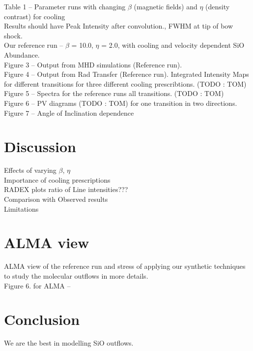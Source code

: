 \documentclass[useAMS,usenatbib,letters]{mn2e}
\begin{document}
Table 1 -- Parameter runs with changing $\beta$ (magnetic fields) and
$\eta$ (density contrast) for cooling \\
Results should have Peak Intensity after convolution., FWHM at tip of
bow shock.\\
Our reference run -- $\beta$ = 10.0, $\eta$ = 2.0, with cooling and
velocity dependent SiO Abundance. \\
Figure 3 -- Output from MHD simulations (Reference run).\\
Figure 4 -- Output from Rad Transfer (Reference run). Integrated
Intensity Maps for different transitions for three different cooling prescribtions. (TODO : TOM)\\
Figure 5 -- Spectra for the reference runs all transitions. (TODO :
TOM)\\
Figure 6 -- PV diagrams (TODO : TOM) for one transition in two directions.
Figure 7 -- Angle of Inclination dependence 
 

\section{Discussion}
Effects of varying $\beta$, $\eta$\\
Importance of cooling prescriptions\\
RADEX plots ratio of Line intensities???\\
Comparison with Observed results \\
Limitations\\

\section{ALMA view}
ALMA view of the reference run and stress of applying our synthetic techniques
to study the molecular outflows in more details.\\
Figure 6. for ALMA -- \\


\section{Conclusion}
We are the best in modelling SiO outflows.






\label{lastpage}
\end{document}
